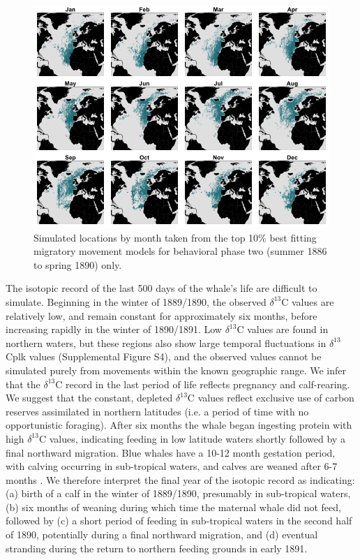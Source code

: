 \documentclass[a4paper,12pt]{article}
\begin{document}
\begin{figure}
 \centering
  \includegraphics[width = \linewidth]{figures/Figure-4-monthly.png}
  \caption{Simulated locations by month taken from the top 10\% best fitting migratory movement models for behavioral phase two (summer 1886 to spring 1890) only.}
  \label{fig4}
\end{figure}

The isotopic record of the last 500 days of the whale's life are difficult to simulate. 
Beginning in the winter of 1889/1890, the observed $\delta^{13}$C values are relatively low, and remain constant for approximately six months, before increasing rapidly in the winter of 1890/1891. 
Low $\delta^{13}$C values are found in northern waters, but these regions also show large temporal fluctuations in $\delta^{13}$Cplk values (Supplemental Figure S4), and the observed values cannot be simulated purely from movements within the known geographic range.
We infer that the $\delta^{13}$C record in the last period of life reflects pregnancy and calf-rearing. 
We suggest that the constant, depleted $\delta^{13}$C values reflect exclusive use of carbon reserves assimilated in northern latitudes (i.e. a period of time with no opportunistic foraging). 
After six months the whale began ingesting protein with high $\delta^{13}$C  values, indicating feeding in low latitude waters shortly followed by a final northward migration. 
Blue whales have a 10-12 month gestation period, with calving occurring in sub-tropical waters, and calves are weaned after 6-7 months \cite{handbook}. 
We therefore interpret the final year of the isotopic record as indicating: (a) birth of a calf in the winter of 1889/1890, presumably in sub-tropical waters, (b) six months of weaning during which time the maternal whale did not feed, followed by (c) a short period of feeding in sub-tropical waters in the second half of 1890, potentially during a final northward migration, and (d) eventual stranding during the return to northern feeding grounds in early 1891.
\end{document}
